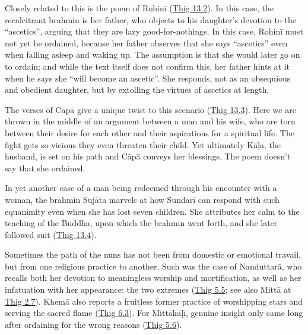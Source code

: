 \documentclass[12pt,openany]{book}%
\begin{document}
Closely related to this is the poem of \textsanskrit{Rohinī} (\href{https://suttacentral.net/thig13.2}{Thig 13.2}). In this case, the recalcitrant brahmin is her father, who objects to his daughter’s devotion to the “ascetics”, arguing that they are lazy good-for-nothings. In this case, \textsanskrit{Rohinī} must not yet be ordained, because her father observes that she says “ascetics” even when falling asleep and waking up. The assumption is that she would later go on to ordain; and while the text itself does not confirm this, her father hints at it when he says she “will become an ascetic”. She responds, not as an obsequious and obedient daughter, but by extolling the virtues of ascetics at length.

The verses of \textsanskrit{Cāpā} give a unique twist to this scenario (\href{https://suttacentral.net/thig13.3}{Thig 13.3}). Here we are thrown in the middle of an argument between a man and his wife, who are torn between their desire for each other and their aspirations for a spiritual life. The fight gets so vicious they even threaten their child. Yet ultimately \textsanskrit{Kāḷa}, the husband, is set on his path and \textsanskrit{Cāpā} conveys her blessings. The poem doesn’t say that she ordained.

In yet another case of a man being redeemed through his encounter with a woman, the brahmin \textsanskrit{Sujāta} marvels at how \textsanskrit{Sundarī} can respond with such equanimity even when she has lost seven children. She attributes her calm to the teaching of the Buddha, upon which the brahmin went forth, and she later followed suit (\href{https://suttacentral.net/thig13.4}{Thig 13.4}).

Sometimes the path of the nuns has not been from domestic or emotional travail, but from one religious practice to another. Such was the case of \textsanskrit{Nanduttarā}, who recalls both her devotion to meaningless worship and mortification, as well as her infatuation with her appearance: the two extremes (\href{https://suttacentral.net/thig5.5}{Thig 5.5}; see also \textsanskrit{Mittā} at \href{https://suttacentral.net/thig2.7}{Thig 2.7}). \textsanskrit{Khemā} also reports a fruitless former practice of worshipping stars and serving the sacred flame (\href{https://suttacentral.net/thig6.3}{Thig 6.3}). For \textsanskrit{Mittākāḷī}, genuine insight only came long after ordaining for the wrong reasons (\href{https://suttacentral.net/thig5.6}{Thig 5.6}).
\end{document}
